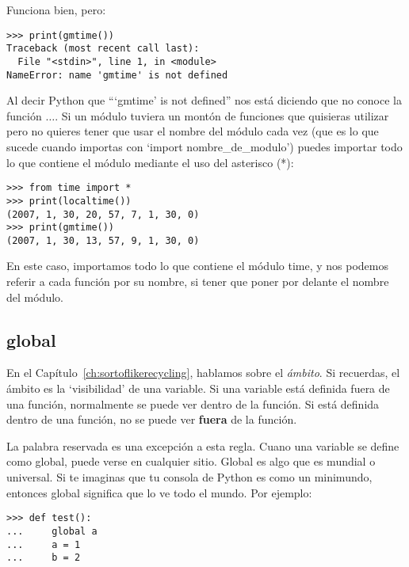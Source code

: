 \noindent
Funciona bien, pero:

\begin{listing}
\begin{verbatim}
>>> print(gmtime())
Traceback (most recent call last):
  File "<stdin>", line 1, in <module>
NameError: name 'gmtime' is not defined
\end{verbatim}
\end{listing}

Al decir Python que ```gmtime' is not defined'' nos está diciendo que no conoce la función $\ldots$. Si un módulo tuviera un montón de funciones que quisieras utilizar pero no quieres tener que usar el nombre del módulo cada vez (que es lo que sucede cuando importas con `import nombre\_de\_modulo') puedes importar todo lo que contiene el módulo mediante el uso del asterisco (*):

\begin{listingignore}
\begin{verbatim}
>>> from time import *
>>> print(localtime())
(2007, 1, 30, 20, 57, 7, 1, 30, 0)
>>> print(gmtime())
(2007, 1, 30, 13, 57, 9, 1, 30, 0)
\end{verbatim}
\end{listingignore}

En este caso, importamos todo lo que contiene el módulo time, y nos podemos referir a cada función por su nombre, si tener que poner por delante el nombre del módulo.

\subsection*{global}

En el Capítulo~\ref{ch:sortoflikerecycling}, hablamos sobre el \emph{ámbito}.  Si recuerdas, el ámbito es la `visibilidad' de una variable. Si una variable está definida fuera de una función, normalmente se puede ver dentro de la función. Si está definida dentro de una función, no se puede ver \textbf{fuera} de la función.
\par
La palabra reservada  es una excepción a esta regla. Cuano una variable se define como global, puede verse en cualquier sitio. Global es algo que es mundial o universal. Si te imaginas que tu consola de Python es como un minimundo, entonces global significa que lo ve todo el mundo.  Por ejemplo:

\begin{listing}
\begin{verbatim}
>>> def test():
...     global a
...     a = 1
...     b = 2
\end{verbatim}
\end{listing}

